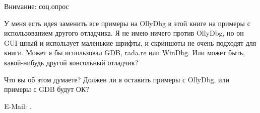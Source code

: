 \vspace*{\fill}

\huge Внимание: соц.опрос
\normalsize

\bigskip
\bigskip
\bigskip

У меня есть идея заменить все примеры на OllyDbg в этой книге на примеры с использованием другого отладчика.
Я не имею ничего против OllyDbg, но он GUI-шный и использует маленькие шрифты, и скриншоты не очень подходят для книги.
Может я бы использовал GDB, rada.re или WinDbg.
Или может быть, какой-нибудь другой консольный отладчик?

Что вы об этом думаете?
Должен ли я оставить примеры с OllyDbg, или примеры с GDB будут ОК?

E-Mail: \GTT{\EMAIL}.

\vspace*{\fill}
\vfill

